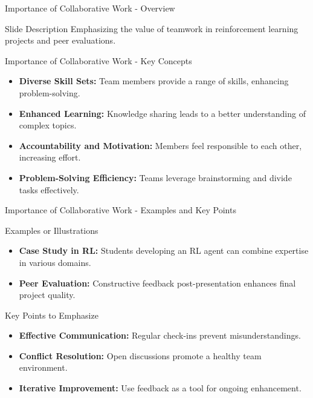 \documentclass[aspectratio=169]{beamer}
\begin{document}
\begin{frame}[fragile]{Importance of Collaborative Work - Overview}
    \begin{block}{Slide Description}
        Emphasizing the value of teamwork in reinforcement learning projects and peer evaluations.
    \end{block}
\end{frame}

\begin{frame}[fragile]{Importance of Collaborative Work - Key Concepts}
    \begin{itemize}
        \item \textbf{Diverse Skill Sets:} Team members provide a range of skills, enhancing problem-solving.
        \item \textbf{Enhanced Learning:} Knowledge sharing leads to a better understanding of complex topics.
        \item \textbf{Accountability and Motivation:} Members feel responsible to each other, increasing effort.
        \item \textbf{Problem-Solving Efficiency:} Teams leverage brainstorming and divide tasks effectively.
    \end{itemize}
\end{frame}

\begin{frame}[fragile]{Importance of Collaborative Work - Examples and Key Points}
    \begin{block}{Examples or Illustrations}
        \begin{itemize}
            \item \textbf{Case Study in RL:} Students developing an RL agent can combine expertise in various domains.
            \item \textbf{Peer Evaluation:} Constructive feedback post-presentation enhances final project quality.
        \end{itemize}
    \end{block}
    
    \begin{block}{Key Points to Emphasize}
        \begin{itemize}
            \item \textbf{Effective Communication:} Regular check-ins prevent misunderstandings.
            \item \textbf{Conflict Resolution:} Open discussions promote a healthy team environment.
            \item \textbf{Iterative Improvement:} Use feedback as a tool for ongoing enhancement.
        \end{itemize}
    \end{block}
\end{frame}
\end{document}
